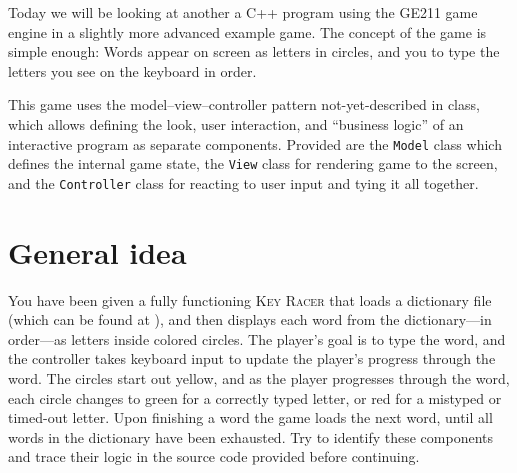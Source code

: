 \documentclass{tufte-handout}
\begin{document}
\maketitle

Today we will be looking at another a C++ program using the GE211 game
engine in a slightly more advanced example game. The concept of the game
is simple enough: Words appear on screen as letters in circles, and you
to type the letters you see on the keyboard in order.

This game uses the model--view--controller pattern not-yet-described in
class, which allows defining the look, user interaction, and ``business
logic'' of an interactive program as separate components. Provided are
the \texttt{Model} class which defines the internal game state, the
\texttt{View} class for rendering game to the screen, and the
\texttt{Controller} class for reacting to user input and tying it all
together.

\CxxPrelims*

\newpage

\section{General idea}

You have been given a fully functioning \textsc{Key Racer} that loads a
dictionary file (which can be found at
), and then displays each word from the
dictionary---in order---as letters inside colored circles. The player's
goal is to type the word, and the controller takes keyboard input to
update the player's progress through the word. The circles start out
yellow, and as the player progresses through the word, each circle
changes to green for a correctly typed letter, or red for a mistyped or
timed-out letter. Upon finishing a word the game loads the next word,
until all words in the dictionary have been exhausted. Try to identify
these components and trace their logic in the source code provided
before continuing.
\end{document}
